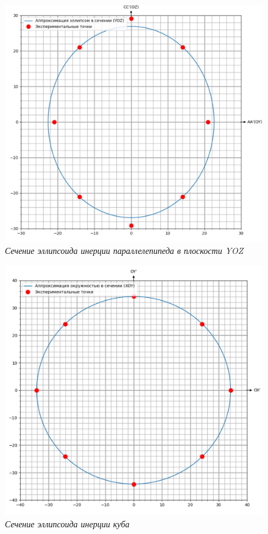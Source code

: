 \documentclass[a4paper, 12pt]{article}
\begin{document}
\begin{figure}[h!]
    \includegraphics[width=1\textwidth]{yoz.png}
    \caption{\textit{Сечение эллипсоида инерции параллелепипеда в плоскости YOZ}}
    \label{yoz}
\end{figure}

\begin{figure}[h!]
    \includegraphics[width=1\textwidth]{cube-ell.png}
    \caption{\textit{Сечение эллипсоида инерции куба}}
    \label{cube-ell}
\end{figure}
\end{document}
